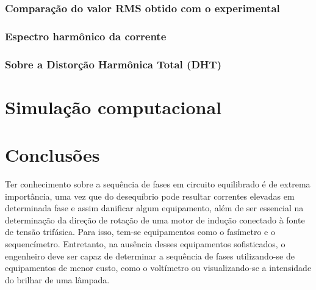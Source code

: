 \documentclass[a4paper,12pt,oneside,openany,table,xcdraw]{article}
\begin{document}
\subsubsection{Comparação do valor RMS obtido com o experimental}

\subsubsection{Espectro harmônico da corrente}

\subsubsection{Sobre a Distorção Harmônica Total (DHT)}



\vspace{1cm}
\section{Simulação computacional} %

\vspace{2cm}
\section{Conclusões} %
Ter conhecimento sobre a sequência de fases em circuito equilibrado é de extrema importância, uma vez que do desequíbrio pode resultar correntes elevadas em determinada fase e assim danificar algum equipamento, além de ser essencial na determinação da direção de rotação de uma motor de indução
conectado à fonte de tensão trifásica. Para isso, tem-se equipamentos como o fasímetro e o sequencímetro. Entretanto, na ausência desses equipamentos sofisticados, o engenheiro deve ser capaz de determinar a sequência de fases utilizando-se de equipamentos de menor custo, como o voltímetro ou visualizando-se a intensidade do brilhar de uma lâmpada.
\end{document}
